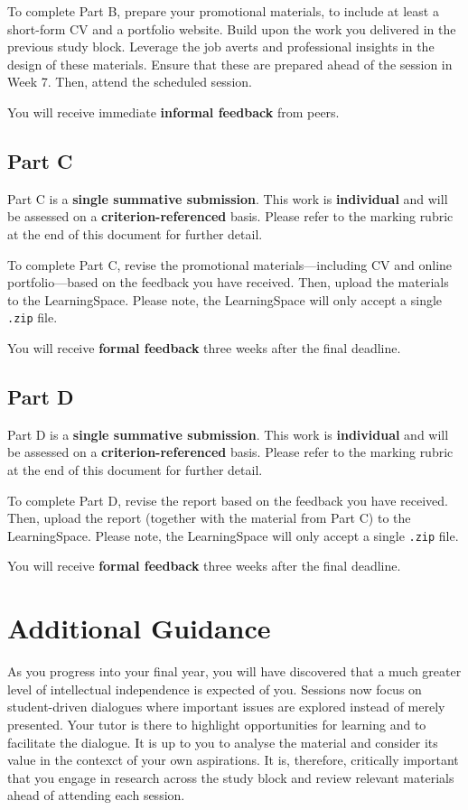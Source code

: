 \documentclass{../../fal_assignment}
\begin{document}
To complete Part B, prepare your promotional materials, to include at least a short-form CV and a portfolio website. Build upon the work you delivered in the previous study block. Leverage the job averts and professional insights in the design of these materials. Ensure that these are prepared ahead of the session in Week 7. Then, attend the scheduled session.

You will receive immediate \textbf{informal feedback} from peers.

\subsection*{Part C}

Part C is a \textbf{single summative submission}. This work is \textbf{individual} and will be assessed on a \textbf{criterion-referenced} basis. Please refer to the marking rubric at the end of this document for further detail.

To complete Part C, revise the promotional materials---including CV and online portfolio---based on the feedback you have received. Then, upload the materials to the LearningSpace. Please note, the LearningSpace will only accept a single \texttt{.zip} file.

You will receive \textbf{formal feedback} three weeks after the final deadline.

\subsection*{Part D}

Part D is a \textbf{single summative submission}. This work is \textbf{individual} and will be assessed on a \textbf{criterion-referenced} basis. Please refer to the marking rubric at the end of this document for further detail.

To complete Part D, revise the report based on the feedback you have received. Then, upload the report (together with the material from Part C) to the LearningSpace. Please note, the LearningSpace will only accept a single \texttt{.zip} file.

You will receive \textbf{formal feedback} three weeks after the final deadline.

\section*{Additional Guidance}

As you progress into your final year, you will have discovered that a much greater level of intellectual independence is expected of you. Sessions now focus on student-driven dialogues where important issues are explored instead of merely presented. Your tutor is there to highlight opportunities for learning and to facilitate the dialogue. It is up to you to analyse the material and consider its value in the contexct of your own aspirations. It is, therefore, critically important that you engage in research across the study block and review relevant materials ahead of attending each session.
\end{document}
